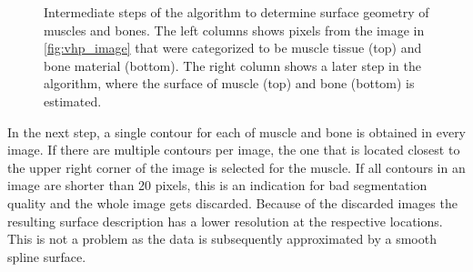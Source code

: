 \begin{figure}
  \caption{Intermediate steps of the algorithm to determine surface geometry of muscles and bones. The left columns shows pixels from the image in \cref{fig:vhp_image} that were categorized to be muscle tissue (top) and bone material (bottom). The right column shows a later step in the algorithm, where the surface of muscle (top) and bone (bottom) is estimated.}%
  \label{fig:extraction}%
\end{figure}%

In the next step, a single contour for each of muscle and bone is obtained in every image. If there are multiple contours per image, the one that is located closest to the upper right corner of the image is selected for the muscle. If all contours in an image are shorter than 20 pixels, this is an indication for bad segmentation quality and the whole image gets discarded. Because of the discarded images the resulting surface description has a lower resolution at the respective locations. This is not a problem as the data is subsequently approximated by a smooth spline surface.

